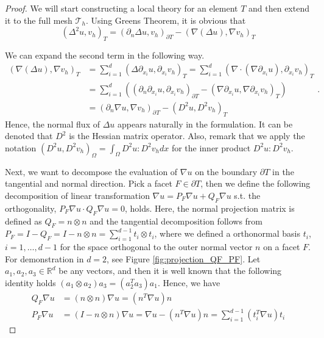 \documentclass[11pt]{article}
\theoremstyle{remark}
\numberwithin{equation}{section}
\begin{document}
\begin{proof}

 We will start constructing a local theory for an element $T$ and then extend it to the full mesh
$\mathcal{T}_{h} $. Using Greens Theorem, it is obvious that
\begin{equation}
    \label{eq:id1}
\left( \Delta ^2 u,v_h \right) _{T }   = \left( \partial _{n} \Delta u, v_h \right) _{\partial T  } - \left( \nabla \left( \Delta  u \right) , \nabla v_h \right) _{T }
\end{equation}

We can expand the second term in the following way.
\begin{equation}
    \label{eq:id2}
    \begin{split}
( \nabla ( \Delta u ) , \nabla v_h ) _{T } & = \sum_{i = 1}^{ d}  ( \Delta  \partial _{x_{i}} u, \partial _{x_{i}}v_h ) _{T }
                                           = \sum_{i = 1}^{d}  ( \nabla \cdot ( \nabla \partial _{x_{i}} u ) , \partial _{x_{i}} v_h )_{T }  \\
&= \sum_{i = 1}^{d}  \left( ( \partial_n  \partial _{x_{i}} u,  \partial _{x_{i}} v_h ) _{\partial T } -   ( \nabla \partial _{x_{i}} u, \nabla \partial _{x_{i}} v_h )_{T } \right) \\
& = (  \partial_n\nabla u, \nabla v_h ) _{\partial_{} T  } - ( D^2 u, D^2v_h ) _{T }
    \end{split}
.\end{equation}
Hence, the normal flux of $\Delta u$ appears naturally in the formulation. It can be denoted that $D^2$ is the Hessian matrix operator. Also, remark that we apply the notation
$( D^2u, D^2v_h )_{\Omega } = \int_{\Omega }^{} D^{2}u : D^2v_h  dx$ for the inner product $D^2u:D^2v_h$.

Next, we want to decompose the evaluation of $\nabla  u $ on the boundary $\partial T$ in the tangential and normal direction. Pick a facet  $F \in \partial T$, then we define the following decomposition of linear transformation $\nabla u = P_{F}\nabla u  + Q_{F}  \nabla u  $ s.t. the
orthogonality, $
P_{F} \nabla u  \cdot Q_{F}  \nabla u = 0$, holds. Here, the normal projection matrix is defined as $Q_{F} = n \otimes n $ and the tangential decomposition follows from $ P_{F} = I - Q_{F} = I - n \otimes n  =  \sum_{i=1}^{d-1} t_{i} \otimes t_i$,
where we defined a orthonormal basis $t_{i}$, $i = 1, \ldots, d-1$ for the space orthogonal to the outer normal vector $n$ on a facet $F$. For demonstration in $d=2$, see Figure \ref{fig:projection_QF_PF}. Let $ a_{1}, a_{2}, a_{3} \in \mathbb{R}
^{d}$ be any vectors, and then it is well known that the following identity holds $ ( a_{1}
\otimes a_{2}  ) a_{3} = ( a_{2}^{T}  a_{3}) a_{1} $. Hence, we have
\begin{equation}
\label{eq:projection}
    \begin{split}
   Q_{F} \nabla u & = ( n \otimes n ) \nabla u =  (n^{T} \nabla u)n \\
   P_{F} \nabla u & =( I - n \otimes n ) \nabla u =   \nabla u  - (n^{T}  \nabla u)n =  \sum_{ i =1 }^{d-1} ( t_{i}^{T}  \nabla u ) t_{i}
    \end{split}
\end{equation}


\end{proof}
\end{document}
